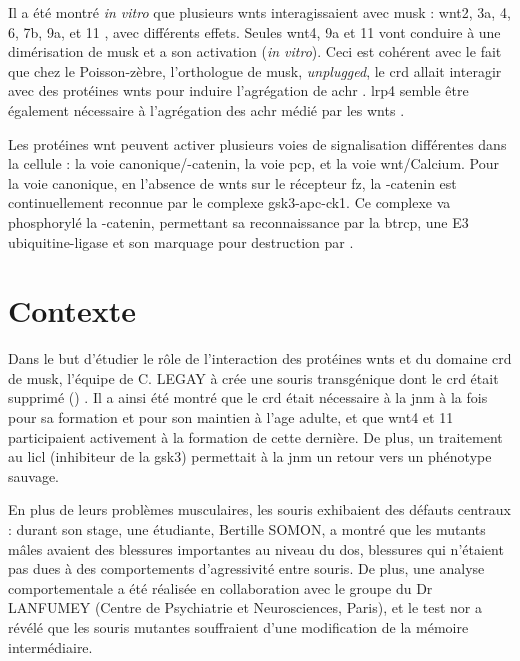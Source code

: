 	Il a été montré \emph{in vitro} que plusieurs \Glspl{wnt} interagissaient avec \gls{musk} : \Gls{wnt}2, 3a, 4, 6, 7b, 9a, et 11 \cite{Strochlic2012, Zhang2012, Barik2014}, avec différents effets. Seules \gls{wnt}4, 9a et 11 vont conduire à une dimérisation de \gls{musk} et a son activation (\emph{in vitro}). Ceci est cohérent avec le fait que chez le Poisson-zèbre, l'orthologue de \gls{musk}, \emph{unplugged}, le \gls{crd} allait interagir avec des protéines \Glspl{wnt} pour induire l'agrégation de \gls{achr} \cite{Jing2009, Gordon2012}. \Gls{lrp}4 semble être également nécessaire à l'agrégation des \gls{achr} médié par les \gls{wnt}s \cite{Zhang2012}.
	
	Les protéines \gls{wnt} peuvent activer plusieurs voies de signalisation différentes dans la cellule :  la voie canonique/\textbeta{}-catenin, la voie \gls{pcp}, et la voie \gls{wnt}/Calcium.  Pour la voie canonique, en l'absence de \Glspl{wnt} sur le récepteur \gls{fz}, la \textbeta{}-catenin est continuellement reconnue par le complexe \acrshort{gsk3}-\acrshort{apc}-\acrshort{ck1}. Ce complexe va phosphorylé la \textbeta{}-catenin, permettant sa reconnaissance par la \gls{btrcp}, une E3 ubiquitine-ligase et son marquage pour destruction par .
	
\section{Contexte}
	\label{sec:Contexte}
	
	Dans le but d'étudier le rôle de l'interaction des protéines \Glspl{wnt} et du domaine \gls{crd} de \gls{musk}, l'équipe de C. LEGAY à crée une souris transgénique dont le \gls{crd} était supprimé (\mcrd) \cite{Messeant2015, Messeant2017}. Il a ainsi été montré que le \gls{crd} était nécessaire à la \gls{jnm} à la fois pour sa formation et pour son maintien à l'age adulte, et que \Gls{wnt}4 et 11 participaient activement à la formation de cette dernière. De plus, un traitement au \gls{licl} (inhibiteur de la \gls{gsk3}) permettait à la \gls{jnm} un retour vers un phénotype sauvage. 
	
	En plus de leurs problèmes musculaires, les souris \mcrd exhibaient des défauts centraux : durant son stage, une étudiante, Bertille SOMON, a montré que les mutants mâles avaient des blessures importantes au niveau du dos, blessures qui n'étaient pas dues à des comportements d'agressivité entre souris. De plus, une analyse comportementale a été réalisée en collaboration avec le groupe du Dr LANFUMEY (Centre de Psychiatrie et Neurosciences, Paris), et le test \gls{nor} a révélé que les souris mutantes souffraient d'une modification de la mémoire intermédiaire.
	
